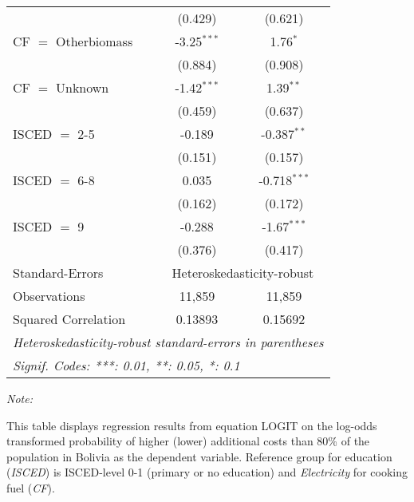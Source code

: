 \begin{table}[htbp!]
\begin{adjustbox}{width = 1\textwidth, max height = 0.95\textheight, center}
\begin{threeparttable}[b]
\begin{tabular}{lcc}
                                 & (0.429)       & (0.621)\\   
            CF $=$ Otherbiomass  & -3.25$^{***}$ & 1.76$^{*}$\\   
                                 & (0.884)       & (0.908)\\   
            CF $=$ Unknown       & -1.42$^{***}$ & 1.39$^{**}$\\   
                                 & (0.459)       & (0.637)\\   
            ISCED $=$ 2-5        & -0.189        & -0.387$^{**}$\\   
                                 & (0.151)       & (0.157)\\   
            ISCED $=$ 6-8        & 0.035         & -0.718$^{***}$\\   
                                 & (0.162)       & (0.172)\\   
            ISCED $=$ 9          & -0.288        & -1.67$^{***}$\\   
                                 & (0.376)       & (0.417)\\   
            \midrule 
            Standard-Errors & \multicolumn{2}{c}{Heteroskedasticity-robust} \\ 
            Observations         & 11,859        & 11,859\\  
            Squared Correlation  & 0.13893       & 0.15692\\  
            \midrule \midrule
            \multicolumn{3}{l}{\emph{Heteroskedasticity-robust standard-errors in parentheses}}\\
            \multicolumn{3}{l}{\emph{Signif. Codes: ***: 0.01, **: 0.05, *: 0.1}}\\
         \end{tabular}
         
         \begin{tablenotes}\item \medskip \textit{Note:}
            \item This table displays regression results from equation LOGIT on the log-odds transformed probability of higher (lower) additional costs than 80\% of the population in Bolivia as the dependent variable. Reference group for education (\textit{ISCED}) is ISCED-level 0-1 (primary or no education) and \textit{Electricity} for cooking fuel (\textit{CF}).
         \end{tablenotes}
      \end{threeparttable}
   \end{adjustbox}
\end{table}


